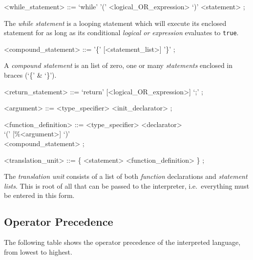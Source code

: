 \documentclass[a4paper,11pt]{article}
\begin{document}
\begin{grammar}
<while_statement> ::=
	`while'
       '('
       <logical_OR_expression>
       `)'
       <statement>
    ;
\end{grammar}

The \textit{while statement} is a looping statement which will execute its enclosed statement for as long as its conditional \textit{logical or expression} evaluates to \verb+true+.

\begin{grammar}
<compound_statement> ::=
    '\{' [<statement_list>] '\}'
    ;
\end{grammar}
A \textit{compound statement} is an list of zero, one or many \textit{statements} enclosed in braces (`\{' \& `\}').
\begin{grammar}
<return_statement> ::=
	`return'
    [<logical_OR_expression>]
       `;'
    ;
\end{grammar}

\begin{grammar}
        <argument> ::=
                <type_specifier>
            <init_declarator>
            ;

        <function_definition> ::=
                <type_specifier>
            <declarator>\\
            `('
            [\%<argument>]
               `)'\\
            <compound_statement>
            ;

        <translation_unit> ::=
            \{  <statement>
            \alt   <function_definition>
            \}
            ;
\end{grammar}

The \textit{translation unit} consists of a list of both \textit{function} declarations and \textit{statement lists}. This is root of all that can be passed to the interpreter, i.e.\ everything must be entered in this form.

\subsection{Operator Precedence}
The following table shows the operator precedence of the interpreted language, from lowest to highest.
\end{document}
